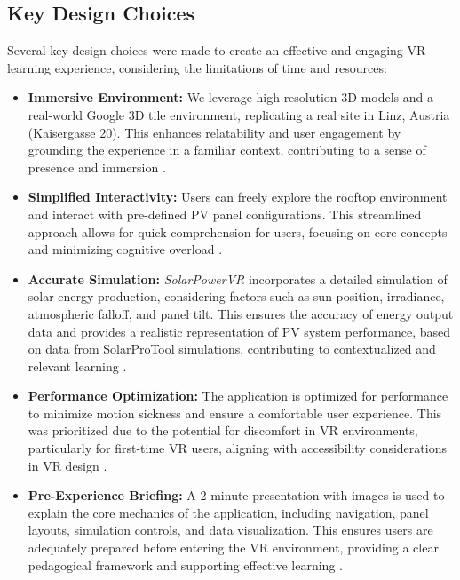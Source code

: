 \documentclass[draft, final]{vutinfth} %
\begin{document}
\subsection{Key Design Choices}

Several key design choices were made to create an effective and engaging VR learning experience, considering the limitations of time and resources:

\begin{itemize}
    \item \textbf{Immersive Environment:} We leverage high-resolution 3D models and a real-world Google 3D tile environment, replicating a real site in Linz, Austria (Kaisergasse 20). This enhances relatability and user engagement by grounding the experience in a familiar context, contributing to a sense of presence and immersion \cite{HuAu2018VrExperience, Winn2002Immersion}.
    \item \textbf{Simplified Interactivity:} Users can freely explore the rooftop environment and interact with pre-defined PV panel configurations. This streamlined approach allows for quick comprehension for users, focusing on core concepts and minimizing cognitive overload \cite{Dalgarno2010Learning, Mikropoulos2011VrEducational}.
    \item \textbf{Accurate Simulation:} \textit{SolarPowerVR} incorporates a detailed simulation of solar energy production, considering factors such as sun position, irradiance, atmospheric falloff, and panel tilt. This ensures the accuracy of energy output data and provides a realistic representation of PV system performance, based on data from SolarProTool simulations, contributing to contextualized and relevant learning \cite{Dalgarno2010Learning, HuAu2018VrExperience}.
    \item \textbf{Performance Optimization:} The application is optimized for performance to minimize motion sickness and ensure a comfortable user experience. This was prioritized due to the potential for discomfort in VR environments, particularly for first-time VR users, aligning with accessibility considerations in VR design \cite{Lege2020VrProgress, Winn2002Immersion}.
    \item \textbf{Pre-Experience Briefing:} A 2-minute presentation with images is used to explain the core mechanics of the application, including navigation, panel layouts, simulation controls, and data visualization. This ensures users are adequately prepared before entering the VR environment, providing a clear pedagogical framework and supporting effective learning \cite{HuAu2018VrExperience, Lege2020VrProgress}.
\end{itemize}
\end{document}
